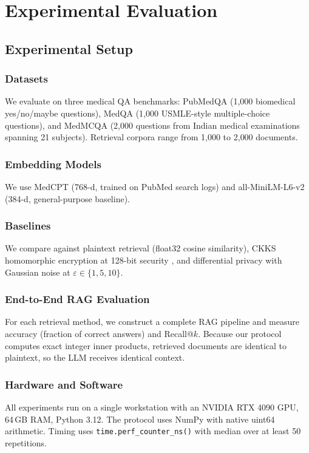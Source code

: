 \documentclass[conference]{IEEEtran}
\begin{document}
\section{Experimental Evaluation}
\label{sec:experiments}

\subsection{Experimental Setup}
\label{sec:exp_setup}

\subsubsection{Datasets}
We evaluate on three medical QA benchmarks:
PubMedQA \cite{jin2019pubmedqa} (1{,}000 biomedical yes/no/maybe questions),
MedQA \cite{jin2021medqa} (1{,}000 USMLE-style multiple-choice questions),
and MedMCQA \cite{pal2022medmcqa} (2{,}000 questions from Indian medical
examinations spanning 21 subjects). Retrieval corpora range from 1{,}000 to
2{,}000 documents.

\subsubsection{Embedding Models}
We use MedCPT \cite{jin2023medcpt} (768-d, trained on PubMed search logs)
and all-MiniLM-L6-v2 \cite{reimers2019sentencebert} (384-d, general-purpose baseline).

\subsubsection{Baselines}
We compare against plaintext retrieval (float32 cosine similarity), CKKS
homomorphic encryption at 128-bit security \cite{cheon2017ckks}, and
differential privacy with Gaussian noise at
$\varepsilon \in \{1, 5, 10\}$.

\subsubsection{End-to-End RAG Evaluation}
For each retrieval method, we construct a complete RAG pipeline and measure
accuracy (fraction of correct answers) and Recall@$k$. Because our protocol
computes exact integer inner products, retrieved documents are identical to
plaintext, so the LLM receives identical context.

\subsubsection{Hardware and Software}
All experiments run on a single workstation with an NVIDIA RTX 4090 GPU,
64\,GB RAM, Python 3.12. The protocol uses NumPy with native uint64
arithmetic. Timing uses \texttt{time.perf\_counter\_ns()} with median over
at least 50 repetitions.
\end{document}
